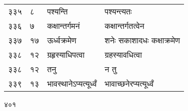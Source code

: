 \documentclass[11pt, openany]{book}
\begin{document}
\begin{longtable}{p{1cm} p{1.5cm} p{4cm} p{4.5cm}}
 ३३५ & ८ & पश्यन्ति & पश्यन्त्यतः \\

 ३३६ & ७ & कक्षान्तर्गमनं & कक्षान्तर्गतत्वेन \\

 ३३७ & १७ & ऊर्ध्वक्रमेण & शनेः सकाशादधः कक्षाक्रमेण \\

 ३३८ & १२ & ग्रहृस्याधिपत्वा & ग्रहस्यावधित्वा \\

 ३३८ & १२ & तनु & न तु \\

 ३३९ & १३ & भावस्थानेऽप्यत्यूर्ध्वं & भावाच्छनेरप्यत्यूर्ध्वं\\ 
\end{longtable}


\newpage

\begin{center}
   ४०१
\end{center}
\end{document}
